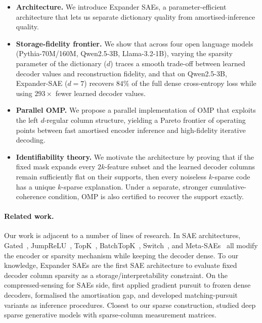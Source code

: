 \documentclass{article}
\theoremstyle{plain}
\theoremstyle{definition}
\theoremstyle{remark}
\begin{document}
\begin{itemize}
    \item \textbf{Architecture.} We introduce Expander SAEs, a parameter-efficient architecture that lets us separate dictionary quality from amortised-inference quality.

    \item \textbf{Storage-fidelity frontier.} We show that across four open language models (Pythia-70M/160M, Qwen2.5-3B, Llama-3.2-1B), varying the sparsity parameter of the dictionary ($d$) traces a smooth trade-off between learned decoder values and reconstruction fidelity, and that on Qwen2.5-3B, Expander-SAE ($d{=}7$) recovers $84\%$ of the full dense cross-entropy loss while using $293\times$ fewer learned decoder values.

    \item \textbf{Parallel OMP.} We propose a parallel implementation of OMP that exploits the left $d$-regular column structure, yielding a Pareto frontier of operating points between fast amortised encoder inference and high-fidelity iterative decoding.

    \item \textbf{Identifiability theory.} We motivate the architecture by proving that if the fixed mask expands every $2k$-feature subset and the learned decoder columns remain sufficiently flat on their supports, then every noiseless $k$-sparse code has a unique $k$-sparse explanation. Under a separate, stronger cumulative-coherence condition, OMP is also certified to recover the support exactly.

\end{itemize}


\paragraph{Related work.}
Our work is adjacent to a number of lines of research.
%
In SAE architectures, Gated~\citep{rajamanoharan2024gated}, JumpReLU~\citep{rajamanoharan2024jumping}, TopK~\citep{gao2024scaling}, BatchTopK~\citep{bussmann2024batchtopk}, Switch~\citep{mudide2024switchsae}, and Meta-SAEs~\citep{bussmann2025meta} all modify the encoder or sparsity mechanism while keeping the decoder dense.
%
To our knowledge, Expander SAEs are the first SAE architecture to evaluate fixed decoder column sparsity as a storage/interpretability constraint.
%
On the compressed-sensing for SAEs side, \citet{gdm2024ito} first applied gradient pursuit to frozen dense decoders, \citet{oneill2025amortisation} formalised the amortisation gap, and \citet{costa2025mpsae} developed matching-pursuit variants as inference procedures.
%
Closest to our sparse construction, \citet{ba2018ds2p} studied deep sparse generative models with sparse-column measurement matrices.
\end{document}
